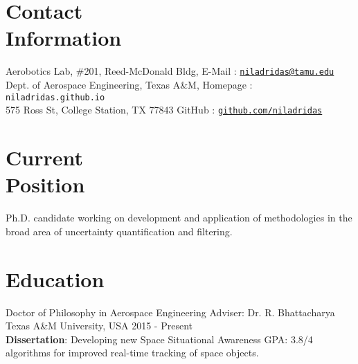 \documentclass[margin,line]{resume}
\begin{document}
\begin{resume}

    \section{\mysidestyle Contact\\Information}

    Aerobotics Lab, \#201, Reed-McDonald Bldg,   		\hfill E-Mail : \href{mailto:niladridas@tamu.edu}{\texttt{niladridas@tamu.edu}} \\
	Dept. of Aerospace Engineering, Texas A\&M,                   \hfill \hfill Homepage : \texttt{niladridas.github.io}  \\
	 575 Ross St, College Station, TX 77843	 \hfill GitHub : \href{https://github.com/niladridas}{\texttt{github.com/niladridas}}
	   
    \section{\mysidestyle Current\\Position}
    Ph.D. candidate working on development and application of methodologies in the broad area of uncertainty quantification and filtering.


    \section{\mysidestyle Education}
    Doctor of Philosophy in Aerospace Engineering \hfill Adviser: Dr. R. Bhattacharya\\
    Texas A\&M University, USA \hfill 2015 - Present \\
    \textbf{Dissertation}: Developing new Space Situational Awareness \hfill GPA: 3.8/4\\algorithms for improved real-time tracking of space objects.  
    

\end{resume}
\end{document}
